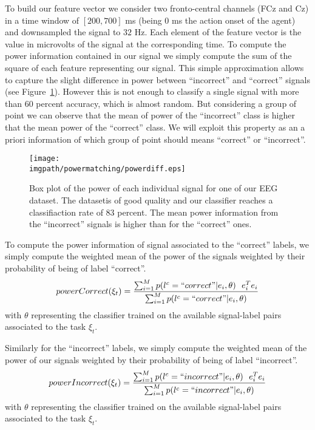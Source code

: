 To build our feature vector we consider two fronto-central channels (FCz and Cz) in a time window of $[200,700]$ ms (being 0 ms the action onset of the agent) and downsampled the signal to $32$ Hz. Each element of the feature vector is the value in microvolts of the signal at the corresponding time. To compute the power information contained in our signal we simply compute the sum of the square of each feature representing our signal. This simple approximation allows to capture the slight difference in power between ``incorrect'' and ``correct'' signals (see Figure~\ref{fig:EEGpower}). However this is not enough to classify a single signal with more than 60 percent accuracy, which is almost random. But considering a group of point we can observe that the mean of power of the ``incorrect'' class is higher that the mean power of the ``correct'' class. We will exploit this property as an a priori information of which group of point should means ``correct'' or ``incorrect''.

\begin{figure}[!ht]
\centering
\texttt{[image: \\imgpath/powermatching/powerdiff.eps]}
\caption{Box plot of the power of each individual signal for one of our EEG dataset. The datasetis of good quality and our classifier reaches a classifiaction rate of 83 percent. The mean power information from the ``incorrect'' signals is higher than for the ``correct'' ones.}
\label{fig:EEGpower}
\end{figure} 


To compute the power information of signal associated to the ``correct'' labels, we simply compute the weighted mean of the power of the signals weighted by their probability of being of label ``correct''. 
\begin{eqnarray}
powerCorrect(\xi_t) = \frac{\sum_{i = 1}^{M} p(l^c = ``correct"| e_i , \theta) ~~ e_i^T e_i}{\sum_{i = 1}^{M} p(l^c = ``correct"| e_i , \theta)}
\label{eq:powerCorrect}
\end{eqnarray}
with $\theta$ representing the classifier trained on the available signal-label pairs associated to the task $\xi_t$.

Similarly for the ``incorrect'' labels, we simply compute the weighted mean of the power of our signals weighted by their probability of being of label ``incorrect''. 
\begin{eqnarray}
powerIncorrect(\xi_t) = \frac{\sum_{i = 1}^{M} p(l^c = ``incorrect"| e_i , \theta) ~~ e_i^T e_i}{\sum_{i = 1}^{M} p(l^c = ``incorrect"| e_i , \theta)}
\label{eq:powerIncorrect}
\end{eqnarray}
with $\theta$ representing the classifier trained on the available signal-label pairs associated to the task $\xi_t$.

